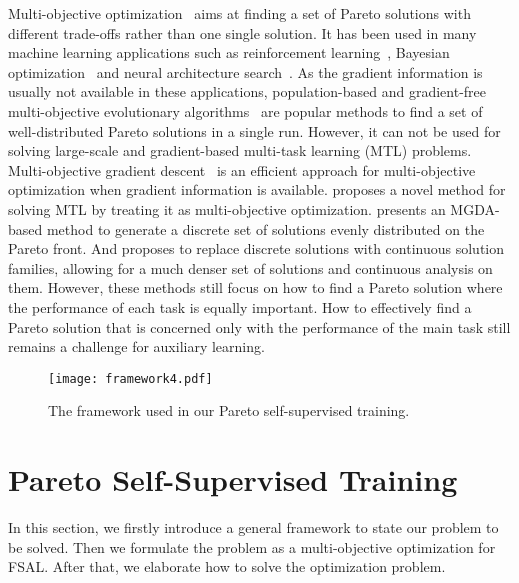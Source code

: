 \documentclass[final]{cvpr}
\begin{document}
Multi-objective optimization~\cite{zuluaga2013active} aims at finding a set of Pareto solutions with different trade-offs rather than one single solution. It has been used in many machine learning applications such as reinforcement learning~\cite{van2014multi}, Bayesian optimization~\cite{hernandez2016predictive} and neural architecture search~\cite{elsken2018efficient}. As the gradient information is usually not available in these applications, population-based and gradient-free multi-objective evolutionary algorithms~\cite{daglib,Zitzler99} are popular methods to find a set of well-distributed Pareto solutions in a single run. However, it can not be used for solving large-scale and gradient-based multi-task learning (MTL) problems. Multi-objective gradient descent~\cite{fliege2000steepest} is an efficient approach for multi-objective optimization when gradient information is available. \cite{sener2018multi} proposes a novel method for solving MTL by treating it as multi-objective optimization. \cite{LinZ0ZK19} presents an MGDA-based method to generate a discrete set of solutions evenly distributed on the Pareto front. And \cite{ma2020continuous} proposes to replace discrete solutions with continuous solution families, allowing for a much denser set of solutions and continuous analysis on them. However, these methods still focus on how to find a Pareto solution where the performance of each task is equally important. How to effectively find a Pareto solution that is concerned only with the performance of the main task still remains a challenge for auxiliary learning.


\begin{figure*}[t]
	\centering 
	\texttt{[image: framework4.pdf]} 
	\caption{The framework used in our Pareto self-supervised training.}
	\label{fig:frame}
\end{figure*}


\section{Pareto Self-Supervised Training}

In this section, we firstly introduce a general framework to state our problem to be solved. Then we formulate the problem as a multi-objective optimization for FSAL. After that, we elaborate how to solve
the optimization problem.
\end{document}
